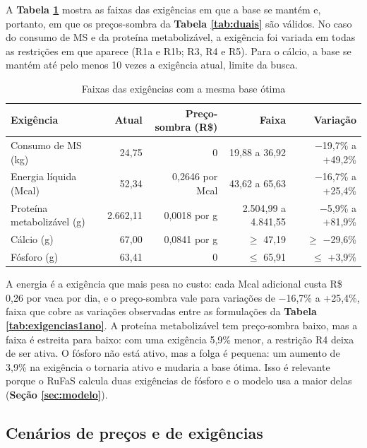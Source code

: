 \documentclass[a4paper,12pt]{article}
\begin{document}
A \textbf{Tabela \ref{tab:faixasexig}} mostra as faixas das exigências em que a base se mantém e, portanto, em que os preços-sombra da \textbf{Tabela \ref{tab:duais}} são válidos. No caso do consumo de MS e da proteína metabolizável, a exigência foi variada em todas as restrições em que aparece (R1a e R1b; R3, R4 e R5). Para o cálcio, a base se mantém até pelo menos 10 vezes a exigência atual, limite da busca.

\begin{table}[htbp]
    \centering
    \caption{Faixas das exigências com a mesma base ótima}
    \label{tab:faixasexig}
    \begin{tabular}{lrrrr}
        \toprule
        \textbf{Exigência} & \textbf{Atual} & \textbf{Preço-sombra (R\$)} & \textbf{Faixa} & \textbf{Variação} \\
        \midrule
        \rowcolor{gray!15}
        Consumo de MS (kg) & 24,75 & 0 & 19,88 a 36,92 & $-$19,7\% a +49,2\% \\
        Energia líquida (Mcal) & 52,34 & 0,2646 por Mcal & 43,62 a 65,63 & $-$16,7\% a +25,4\% \\
        \rowcolor{gray!15}
        Proteína metabolizável (g) & 2.662,11 & 0,0018 por g & 2.504,99 a 4.841,55 & $-$5,9\% a +81,9\% \\
        Cálcio (g) & 67,00 & 0,0841 por g & $\geq$ 47,19 & $\geq$ $-$29,6\% \\
        \rowcolor{gray!15}
        Fósforo (g) & 63,41 & 0 & $\leq$ 65,91 & $\leq$ +3,9\% \\
        \bottomrule
    \end{tabular}
\end{table}

A energia é a exigência que mais pesa no custo: cada Mcal adicional custa R\$ 0,26 por vaca por dia, e o preço-sombra vale para variações de $-$16,7\% a +25,4\%, faixa que cobre as variações observadas entre as formulações da \textbf{Tabela \ref{tab:exigencias1ano}}. A proteína metabolizável tem preço-sombra baixo, mas a faixa é estreita para baixo: com uma exigência 5,9\% menor, a restrição R4 deixa de ser ativa. O fósforo não está ativo, mas a folga é pequena: um aumento de 3,9\% na exigência o tornaria ativo e mudaria a base ótima. Isso é relevante porque o RuFaS calcula duas exigências de fósforo e o modelo usa a maior delas (\textbf{Seção \ref{sec:modelo}}).

\subsection{Cenários de preços e de exigências}
\end{document}
